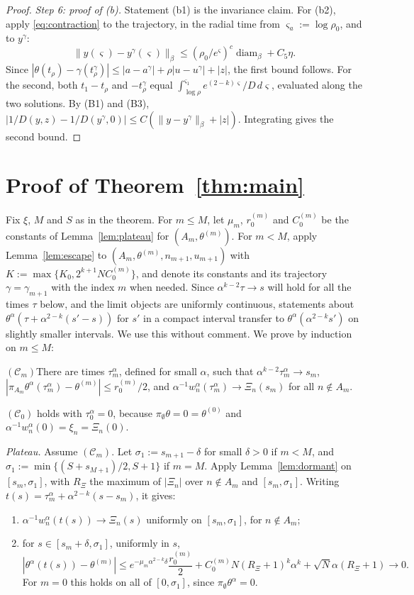\documentclass[11pt]{article}
\theoremstyle{definition}
\theoremstyle{remark}
\numberwithin{equation}{section}
\begin{document}
\begin{proof}
\emph{Step 6: proof of (b).} Statement (b1) is the invariance claim. For (b2), apply \eqref{eq:contraction} to the trajectory, in the radial time from $\varsigma_a:=\log\rho_0$, and to $y^\gamma$:
\[
\|y(\varsigma)-y^\gamma(\varsigma)\|_\beta\le(\rho_0/e^\varsigma)^c\operatorname{diam}_\beta+C_5\eta .
\]
Since $|\theta(t_\rho)-\gamma(t^\gamma_\rho)|\le|a-a^\gamma|+\rho|u-u^\gamma|+|z|$, the first bound follows. For the second, both $t_1-t_\rho$ and $-t^\gamma_\rho$ equal $\int_{\log\rho}^{\varsigma_1}e^{(2-k)\varsigma}/D\,d\varsigma$, evaluated along the two solutions. By (B1) and (B3), $|1/D(y,z)-1/D(y^\gamma,0)|\le C(\|y-y^\gamma\|_\beta+|z|)$. Integrating gives the second bound.
\end{proof}

\section{Proof of Theorem~\ref{thm:main}}\label{sec:proof-main}

Fix $\xi$, $M$ and $S$ as in the theorem. For $m\le M$, let $\mu_m$, $r_0^{(m)}$ and $C_0^{(m)}$ be the constants of Lemma~\ref{lem:plateau} for $(A_m,\theta^{(m)})$. For $m<M$, apply Lemma~\ref{lem:escape} to $(A_m,\theta^{(m)},n_{m+1},u_{m+1})$ with $K:=\max\{K_0,2^{k+1}NC_0^{(m)}\}$, and denote its constants and its trajectory $\gamma=\gamma_{m+1}$ with the index $m$ when needed. Since $\alpha^{k-2}\tau\to s$ will hold for all the times $\tau$ below, and the limit objects are uniformly continuous, statements about $\theta^\alpha(\tau+\alpha^{2-k}(s'-s))$ for $s'$ in a compact interval transfer to $\theta^\alpha(\alpha^{2-k}s')$ on slightly smaller intervals. We use this without comment. We prove by induction on $m\le M$:

\smallskip\noindent$(\mathcal C_m)$\quad There are times $\tau^\alpha_m$, defined for small $\alpha$, such that $\alpha^{k-2}\tau^\alpha_m\to s_m$, $|\pi_{A_m}\theta^\alpha(\tau^\alpha_m)-\theta^{(m)}|\le r^{(m)}_0/2$, and $\alpha^{-1}w_n^\alpha(\tau^\alpha_m)\to\Xi_n(s_m)$ for all $n\notin A_m$.

\smallskip
$(\mathcal C_0)$ holds with $\tau^\alpha_0=0$, because $\pi_\emptyset\theta=0=\theta^{(0)}$ and $\alpha^{-1}w_n^\alpha(0)=\xi_n=\Xi_n(0)$.

\emph{Plateau.} Assume $(\mathcal C_m)$. Let $\sigma_1:=s_{m+1}-\delta$ for small $\delta>0$ if $m<M$, and $\sigma_1:=\min\{(S+s_{M+1})/2,S+1\}$ if $m=M$. Apply Lemma~\ref{lem:dormant} on $[s_m,\sigma_1]$, with $R_\Xi$ the maximum of $|\Xi_n|$ over $n\notin A_m$ and $[s_m,\sigma_1]$. Writing $t(s)=\tau^\alpha_m+\alpha^{2-k}(s-s_m)$, it gives:
\begin{enumerate}[label=(P\arabic*),leftmargin=3em]
\item $\alpha^{-1}w_n^\alpha(t(s))\to\Xi_n(s)$ uniformly on $[s_m,\sigma_1]$, for $n\notin A_m$;
\item for $s\in[s_m+\delta,\sigma_1]$, uniformly in $s$,
\[
|\theta^\alpha(t(s))-\theta^{(m)}|\le e^{-\mu_m\alpha^{2-k}\delta}\frac{r_0^{(m)}}2+C_0^{(m)}N(R_\Xi+1)^k\alpha^k+\sqrt N\alpha(R_\Xi+1)\to0 .
\] For $m=0$ this holds on all of $[0,\sigma_1]$, since $\pi_\emptyset\theta^\alpha=0$.
\end{enumerate}
\end{document}
